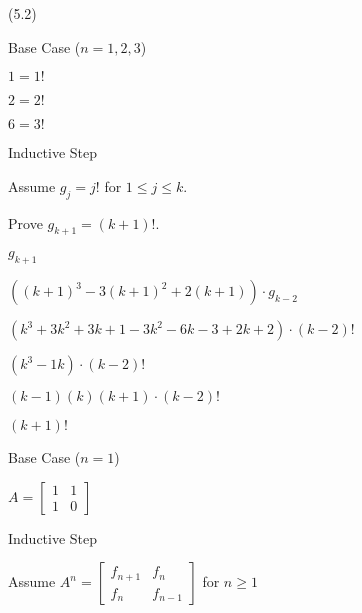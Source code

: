 \documentclass{exam}
\begin{document}
\begin{questions}
\newpage

 (5.2)

\begin{center}
Base Case (\(n = 1, 2, 3\))

\(1 = 1!\)

\(2 = 2!\)

\(6 = 3!\)
\vspace{5px}

Inductive Step

Assume \( g_j = j! \) for \(1 \leq j \leq k\).

Prove \( g_{k+1} = (k+1)! \).

\(g_{k+1}\)

\(((k+1)^3 - 3(k+1)^2 + 2(k+1)) \cdot g_{k-2} \)

\((k^3 + 3k^2 + 3k + 1 - 3k^2 - 6k - 3 + 2k + 2) \cdot (k-2)! \)

\((k^3 - 1k) \cdot (k-2)! \)

\( (k-1)(k)(k+1) \cdot (k-2)! \)

\( (k+1)! \)

\end{center}


\begin{center}
Base Case (\(n = 1\))

\( A =
\begin{bmatrix}
1 & 1\\
1 & 0
\end{bmatrix}
\)

\vspace{5px}

Inductive Step

Assume 
\( A^n =
\begin{bmatrix}
f_{n+1} & f_{n}\\
f_{n} & f_{n-1}
\end{bmatrix}
\) for \(n \geq 1\)


\end{center}
\end{questions}
\end{document}
